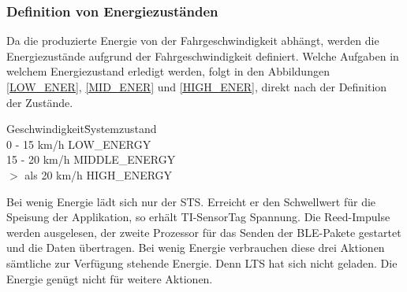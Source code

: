 
\subsubsection*{Definition von Energiezuständen}
\label{def_zustaende} 

Da die produzierte Energie von der Fahrgeschwindigkeit abhängt, werden die Energiezustände aufgrund der Fahrgeschwindigkeit definiert. Welche Aufgaben in welchem Energiezustand erledigt werden, folgt in den Abbildungen \ref{LOW_ENER}, \ref{MID_ENER} und \ref{HIGH_ENER}, direkt nach der Definition der Zustände. 

\begin{minipage}{\textwidth}
    \begin{tabbing}
       Geschwindigkeit\quad\= Systemzustand\\[0.8ex]
       0 - 15 km/h        \> LOW\_ENERGY\\
       15 - 20 km/h       \> MIDDLE\_ENERGY\\
       $>$ als 20 km/h    \> HIGH\_ENERGY\\    
    \end{tabbing}
\end{minipage}

Bei wenig Energie lädt sich nur der STS. Erreicht er den Schwellwert für die Speisung der Applikation, so erhält TI-SensorTag Spannung. Die Reed-Impulse werden ausgelesen, der zweite Prozessor für das Senden der BLE-Pakete gestartet und die Daten übertragen. Bei wenig Energie verbrauchen diese drei Aktionen sämtliche zur Verfügung stehende Energie. Denn LTS hat sich nicht geladen. Die Energie genügt nicht für weitere Aktionen.

